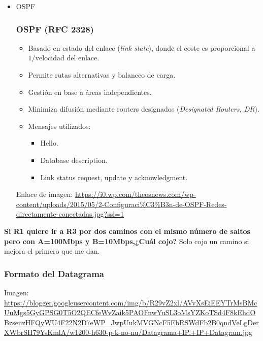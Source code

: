 \documentclass[a4paper,12pt]{article}
\begin{document}
\begin{itemize}
    \item OSPF 
    \subsubsection*{OSPF (RFC 2328)}

    \begin{itemize}
        \item Basado en estado del enlace (\textit{link state}), donde el coste es proporcional a \(1 / \text{velocidad del enlace}\).
        \item Permite rutas alternativas y balanceo de carga.
        \item Gestión en base a áreas independientes.
        \item Minimiza difusión mediante routers designados (\textit{Designated Routers, DR}).
        \item Mensajes utilizados:
        \begin{itemize}
            \item Hello.
            \item Database description.
            \item Link status request, update y acknowledgment.
        \end{itemize}
    \end{itemize}

    Enlace de imagen: \url{https://i0.wp.com/theosnews.com/wp-content/uploads/2015/05/2-Configuraci%C3%B3n-de-OSPF-Redes-directamente-conectadas.jpg?ssl=1}

\end{itemize}



\begin{tcolorbox}[colback=blue!5!white,colframe=blue!75!black,title=Pregunta de Examen]
    \textbf{Si R1 quiere ir a R3 por dos caminos con el mismo número de saltos pero con A=100Mbps y B=10Mbps,¿Cuál cojo?}
    Solo cojo un camino si mejora el primero que me dan.
\end{tcolorbox}

\subsubsection{Formato del Datagrama}

Imagen: \url{https://blogger.googleusercontent.com/img/b/R29vZ2xl/AVvXsEiEEYTrMsBMcUuMgs5GyGPSG0T5O2QECfeWvZaik5PAOFnwYuSL3oMsYZKoTSd4F8kEhdOBzseuzHFQyWU4F22N2D7eWP_JwpUukMVGNcF5EbRSWdFb2B0qndVeLgDerXWbrSH79YsKmlA/w1200-h630-p-k-no-nu/Datagrama+IP.+IP+Datagram.jpg}
\end{document}

